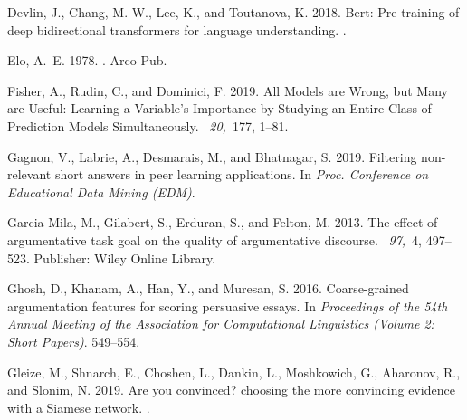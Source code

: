 \documentclass[notitlepage,12pt]{jedm}
\begin{document}
\begin{thebibliography}{}
{\sc Devlin, J.}, {\sc Chang, M.-W.}, {\sc Lee, K.}, {\sc and} {\sc Toutanova,
  K.} 2018.
\newblock Bert: {Pre}-training of deep bidirectional transformers for language
  understanding.
.

{\sc Elo, A.~E.} 1978.
.
\newblock Arco Pub.

{\sc Fisher, A.}, {\sc Rudin, C.}, {\sc and} {\sc Dominici, F.} 2019.
\newblock All {Models} are {Wrong}, but {Many} are {Useful}: {Learning} a
  {Variable}'s {Importance} by {Studying} an {Entire} {Class} of {Prediction}
  {Models} {Simultaneously}.
~{\em 20,\/}~177, 1--81.

{\sc Gagnon, V.}, {\sc Labrie, A.}, {\sc Desmarais, M.}, {\sc and} {\sc
  Bhatnagar, S.} 2019.
\newblock Filtering non-relevant short answers in peer learning applications.
\newblock In {\em Proc. {Conference} on {Educational} {Data} {Mining} ({EDM})}.

{\sc Garcia-Mila, M.}, {\sc Gilabert, S.}, {\sc Erduran, S.}, {\sc and} {\sc
  Felton, M.} 2013.
\newblock The effect of argumentative task goal on the quality of argumentative
  discourse.
~{\em 97,\/}~4, 497--523.
\newblock Publisher: Wiley Online Library.

{\sc Ghosh, D.}, {\sc Khanam, A.}, {\sc Han, Y.}, {\sc and} {\sc Muresan, S.}
  2016.
\newblock Coarse-grained argumentation features for scoring persuasive essays.
\newblock In {\em Proceedings of the 54th {Annual} {Meeting} of the
  {Association} for {Computational} {Linguistics} ({Volume} 2: {Short}
  {Papers})}. 549--554.

{\sc Gleize, M.}, {\sc Shnarch, E.}, {\sc Choshen, L.}, {\sc Dankin, L.}, {\sc
  Moshkowich, G.}, {\sc Aharonov, R.}, {\sc and} {\sc Slonim, N.} 2019.
\newblock Are you convinced? choosing the more convincing evidence with a
  {Siamese} network.
.


\end{thebibliography}
\end{document}
